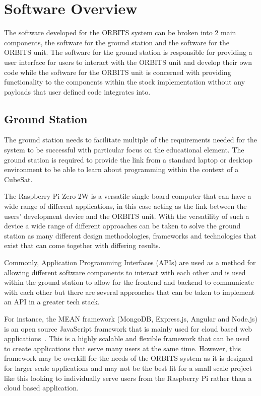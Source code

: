 \documentclass[a4paper,12pt,titlepage]{report}
\begin{document}
\section{Software Overview} \label{software_design}
The software developed for the ORBITS system can be broken into 2 main components, the software for the ground station and the software for the ORBITS unit. The software for the ground station is responsible for providing a user interface for users to interact with the ORBITS unit and develop their own code while the software for the ORBITS unit is concerned with providing functionality to the components within the stock implementation without any payloads that user defined code integrates into.


\subsection{Ground Station}
The ground station needs to facilitate multiple of the requirements needed for the system to be successful with particular focus on the educational element. The ground station is required to provide the link from a standard laptop or desktop environment to be able to learn about programming within the context of a CubeSat.

The Raspberry Pi Zero 2W is a versatile single board computer that can have a wide range of different applications, in this case acting as the link between the users' development device and the ORBITS unit. With the versatility of such a device a wide range of different approaches can be taken to solve the ground station as many different design methodologies, frameworks and technologies that exist that can come together with differing results.

Commonly, Application Programming Interfaces (APIs) are used as a method for allowing different software components to interact with each other and is used within the ground station to allow for the frontend and backend to communicate with each other but there are several approaches that can be taken to implement an API in a greater tech stack.

For instance, the MEAN framework (MongoDB, Express.js, Angular and Node.js) is an open source JavaScript framework that is mainly used for cloud based web applications~\cite{MEAN}. This is a highly scalable and flexible framework that can be used to create applications that serve many users at the same time. However, this framework may be overkill for the needs of the ORBITS system as it is designed for larger scale applications and may not be the best fit for a small scale project like this looking to individually serve users from the Raspberry Pi rather than a cloud based application.
\end{document}
